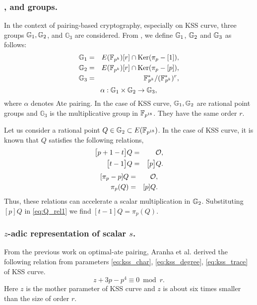 \subsubsection{,  and  groups.} In the context of pairing-based cryptography, especially on KSS curve, three groups ${\mathbb{G}}_{1}, {\mathbb{G}}_{2}$, and $\mathbb{G}_3$ are considered. From \cite{PAIRING:MANS13}, we define ${\mathbb{G}}_{1}$, ${\mathbb{G}}_{2}$ and ${\mathbb{G}}_{3}$ as follows:
\begin{eqnarray}\label{eq:g1}
{\mathbb{G}}_{1} & = &  E({\mathbb{F}}_{p^{k}}) [r] \cap \text{Ker}(\pi_p - [1]), \nonumber \\
{\mathbb{G}}_{2} & = &  E({\mathbb{F}}_{p^{k}}) [r] \cap \text{Ker}(\pi_p - [p]), \nonumber \\
{\mathbb{G}}_{3} & = & {{\mathbb{F}}^{\ast}}_{\!\!\!p^{k}}/({{\mathbb{F}}^{\ast}}_{\!\!\!p^{k}})^r, \nonumber
\end{eqnarray}
\begin{equation}
\alpha : {\mathbb{G}}_{1} \times {\mathbb{G}}_{2} \rightarrow {\mathbb{G}}_{3},
\end{equation}
where $\alpha$ denotes Ate pairing. In the case of KSS curve, ${\mathbb{G}}_{1}, {\mathbb{G}}_{2}$ are rational point groups and $\mathbb{G}_3$ is the multiplicative group in $\mathbb{F}_{p^{18}}$. They have the same order $r$. 

Let us consider a rational point $Q\in {\mathbb{G}}_{2} \subset E({\mathbb{F}}_{p^{18}})$.
In the case of KSS curve, it is known that $Q$ satisfies the following relations,
\begin{eqnarray}\label{eq:Q_rel1}
\big[p+1-t\big]Q & = & \cal O, \nonumber \\
\big[t-1\big]Q  & = & \big[p\big]Q.
\end{eqnarray}
\begin{eqnarray}\label{eq:Q_rel2}
[\pi_p -p]Q & = &\cal O, \nonumber \\
\pi_p(Q) & = & [p]Q.
\end{eqnarray}
Thus, these relations can accelerate a scalar multiplication in ${\mathbb{G}}_{2}$.
Substituting $[p]Q$ in \eqref{eq:Q_rel1} we find $[t-1]Q = \pi_p(Q)$.

\subsubsection{$z$-adic representation of scalar $s$.}
From the previous work on optimal-ate pairing, Aranha et al. \cite{PAIRING:AFKMR12} derived the following relation from parameters \eqref{eq:kss_char}, \eqref{eq:kss_degree}, \eqref{eq:kss_trace} of KSS curve.
\begin{equation}\label{eq:aranha_relation}
z+3p-p^4 \equiv 0 \bmod {r}.
\end{equation}
Here $z$ is the mother parameter of KSS curve and $z$ is about six times smaller than the size of order $r$. 

